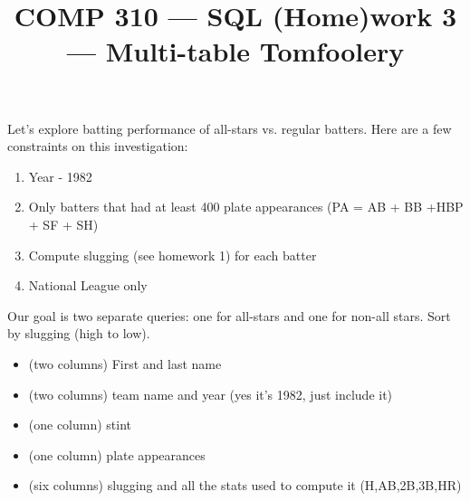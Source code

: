 \documentclass[nobib]{tufte-handout}
\title{COMP 310 --- SQL (Home)work 3 --- Multi-table Tomfoolery }
\author{  }
\date{ }
\begin{document}
\maketitle

Let's explore batting performance of all-stars vs. regular batters.  Here are a few constraints on this investigation: 
\begin{enumerate}
    \item Year - 1982
    \item Only batters that had at least 400 plate appearances (PA = AB + BB +HBP + SF + SH)
    \item Compute slugging (see homework 1) for each batter 
    \item National League only
\end{enumerate}

Our goal is two separate queries: one for all-stars and one for non-all stars. Sort by slugging (high to low).
\begin{itemize}
    \item (two columns) First and last name
    \item (two columns) team name and year (yes it's 1982, just include it)
    \item (one column) stint 
    \item (one column) plate appearances
    \item (six columns) slugging and all the stats used to compute it (H,AB,2B,3B,HR)
\end{itemize}
\end{document}
